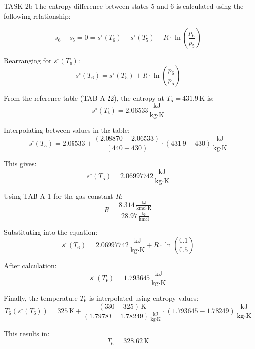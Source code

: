 TASK 2b  
The entropy difference between states 5 and 6 is calculated using the following relationship:  

\[
s_6 - s_5 = 0 = s^\circ(T_6) - s^\circ(T_5) - R \cdot \ln\left(\frac{p_6}{p_5}\right)
\]

Rearranging for \( s^\circ(T_6) \):  
\[
s^\circ(T_6) = s^\circ(T_5) + R \cdot \ln\left(\frac{p_6}{p_5}\right)
\]

From the reference table (TAB A-22), the entropy at \( T_5 = 431.9 \, \text{K} \) is:  
\[
s^\circ(T_5) = 2.06533 \, \frac{\text{kJ}}{\text{kg·K}}
\]

Interpolating between values in the table:  
\[
s^\circ(T_5) = 2.06533 + \frac{(2.08870 - 2.06533)}{(440 - 430)} \cdot (431.9 - 430) \, \frac{\text{kJ}}{\text{kg·K}}
\]

This gives:  
\[
s^\circ(T_5) = 2.06997742 \, \frac{\text{kJ}}{\text{kg·K}}
\]

Using TAB A-1 for the gas constant \( R \):  
\[
R = \frac{8.314 \, \frac{\text{kJ}}{\text{kmol·K}}}{28.97 \, \frac{\text{kg}}{\text{kmol}}}
\]

Substituting into the equation:  
\[
s^\circ(T_6) = 2.06997742 \, \frac{\text{kJ}}{\text{kg·K}} + R \cdot \ln\left(\frac{0.1}{0.5}\right)
\]

After calculation:  
\[
s^\circ(T_6) = 1.793645 \, \frac{\text{kJ}}{\text{kg·K}}
\]

Finally, the temperature \( T_6 \) is interpolated using entropy values:  
\[
T_6(s^\circ(T_6)) = 325 \, \text{K} + \frac{(330 - 325) \, \text{K}}{(1.79783 - 1.78249) \, \frac{\text{kJ}}{\text{kg·K}}} \cdot (1.793645 - 1.78249) \, \frac{\text{kJ}}{\text{kg·K}}
\]

This results in:  
\[
T_6 = 328.62 \, \text{K}
\]